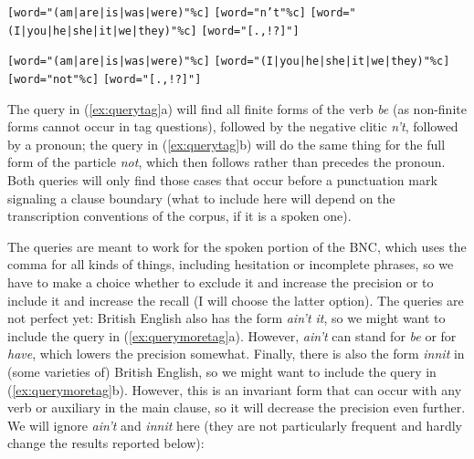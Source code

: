 \begin{exe}
\ex
\begin{xlist}
\label{ex:querytag}
\ex \begin{minipage}[t]{0.85\textwidth} \raggedright \texttt{[word="(am|\allowbreak are|\allowbreak is|\allowbreak was|\allowbreak were)"\%c]} \texttt{[word="n't"\%c]} \texttt{[word="(I|\allowbreak you|\allowbreak he|\allowbreak she|\allowbreak it|\allowbreak we|\allowbreak they)"\%c]} \texttt{[word="[.,!?]"]} \end{minipage}
\ex \begin{minipage}[t]{0.85\textwidth} \raggedright \texttt{[word="(am|\allowbreak are|\allowbreak is|\allowbreak was|\allowbreak were)"\%c]} \texttt{[word="(I|\allowbreak you|\allowbreak he|\allowbreak she|\allowbreak it|\allowbreak we|\allowbreak they)"\%c]} \texttt{[word="not"\%c]} \texttt{[word="[.,!?]"]} \end{minipage}
\end{xlist}
\end{exe}

The query in (\ref{ex:querytag}a) will find all finite forms of the verb  \textit{be} (as non\hyp{}finite forms cannot occur in tag questions),  followed by the negative  clitic  \textit{n't}, followed by a pronoun;  the query in (\ref{ex:querytag}b) will do the same thing for the full form of the particle \textit{not}, which then follows rather than precedes the pronoun. Both queries will only find those cases that occur before a punctuation mark signaling a clause boundary (what to include here will depend on the transcription  conventions of the corpus, if it is a spoken  one).

The queries are meant to work for the spoken  portion of the BNC,  which uses the comma for all kinds of things, including hesitation or incomplete phrases, so we have to make a choice whether to exclude it and increase the precision  or to include it and increase the recall  (I will choose the latter option). The queries are not perfect yet: British  English also has the form \textit{ain't it}, so we might want to include the query in (\ref{ex:querymoretag}a). However, \textit{ain't} can stand for \textit{be} or for \textit{have}, which lowers the precision somewhat. Finally, there is also the form \textit{innit} in (some varieties  of) British English, so we might want to include the query in (\ref{ex:querymoretag}b). However, this is an invariant form that can occur with any verb  or auxiliary in the main clause, so it will decrease the precision  even further. We will ignore \textit{ain't} and \textit{innit} here (they are not particularly frequent and hardly change the results reported below):

